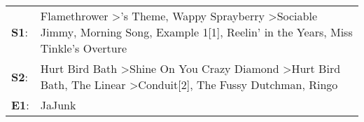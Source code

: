 \begin{supertabular}{p{0.03\textwidth}p{0.92\textwidth}}
 \textbf{S1}:  &  Flamethrower\textsuperscript{} \textgreater {}'s Theme\textsuperscript{}, \enspace Wappy Sprayberry\textsuperscript{} \textgreater \enspace Sociable Jimmy\textsuperscript{}, \enspace Morning Song\textsuperscript{}, \enspace Example 1[1]\textsuperscript{}, \enspace Reelin' in the Years\textsuperscript{}, \enspace Miss Tinkle's Overture\textsuperscript{}  \enspace  \\
 \textbf{S2}:  &                                        Hurt Bird Bath\textsuperscript{} \textgreater \enspace Shine On You Crazy Diamond\textsuperscript{} \textgreater \enspace Hurt Bird Bath\textsuperscript{}, \enspace The Linear\textsuperscript{} \textgreater \enspace Conduit[2]\textsuperscript{}, \enspace The Fussy Dutchman\textsuperscript{}, \enspace Ringo\textsuperscript{}  \enspace  \\
 \textbf{E1}:  &                                                                                                                                                                                                                                                                                                                                                     JaJunk\textsuperscript{}  \enspace  \\
\end{supertabular}
